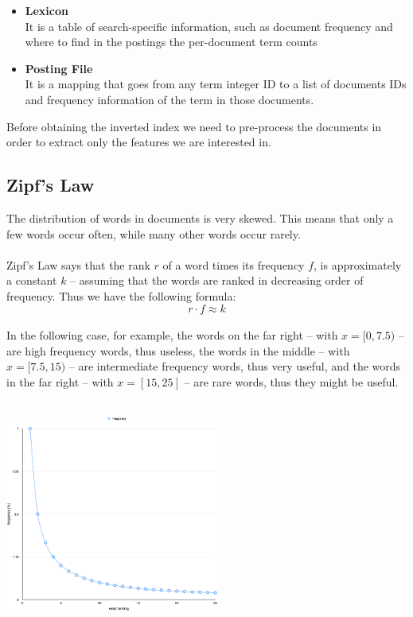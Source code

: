 \documentclass{article}
\begin{document}
\begin{itemize}
    \item \textbf{Lexicon}
	\vspace{.2cm} \\
	It is a table of search-specific information, such as document frequency and where to find in the postings the per-document term counts
	
	\item \textbf{Posting File}
	\vspace{.2cm} \\
	It is a mapping that goes from any term integer ID to a list of documents IDs and frequency information of the term in those documents.
\end{itemize}
Before obtaining the inverted index we need to pre-process the documents in order to extract only the features we are interested in.

\subsection{Zipf's Law}
The distribution of words in documents is very skewed. This means that only a few words occur often, while many other words occur rarely. \\ \\
Zipf's Law says that the rank $r$ of a word times its frequency $f$, is approximately a constant $k$ -- assuming that the words are ranked in decreasing order of frequency. Thus we have the following formula:
\[ r \cdot f \approx k \] \\
In the following case, for example, the words on the far right -- with $x = [0, 7.5)$ -- are high frequency words, thus useless, the words in the middle -- with $x = [7.5, 15)$ -- are intermediate frequency words, thus very useful, and the words in the far right -- with $x = [15,25]$ -- are rare words, thus they might be useful. \\ \\

\begin{center}
	\includegraphics[width=7cm]{zipf.png}
\end{center}
\end{document}
